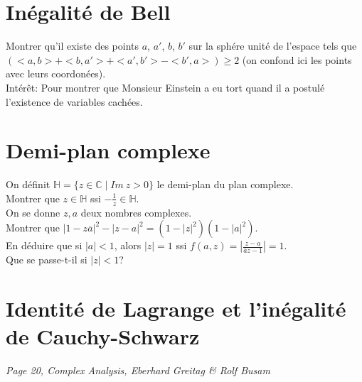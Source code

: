 \documentclass{article}
\begin{document}
\section{In\'egalit\'e de Bell}
Montrer qu'il existe des points $a$, $a'$, $b$, $b'$ sur la sph\'ere unit\'e de l'espace tels que $(<a,b>+<b,a'>+<a',b'>-<b',a>)\geq 2$ (on confond ici les points avec leurs coordon\'ees).\\
Int\'er\^et: Pour montrer que Monsieur Einstein a eu tort quand il a postul\'e l'existence de variables cach\'ees.
\section{Demi-plan complexe}
On d\'efinit $\mathbb{H}=\{z\in\mathbb{C}\mid Im~z>0\}$ le demi-plan du plan complexe.\\
Montrer que $z\in\mathbb{H}$ ssi $-\frac{1}{z}\in\mathbb{H}$.\\
On se donne $z,a$ deux nombres complexes.\\
Montrer que $|1-z\overline{a}|^2-|z-a|^2=(1-|z|^2)(1-|a|^2)$.\\
En d\'eduire que si $|a|<1$, alors $|z|=1$ ssi $f(a,z)=|\frac{z-a}{\overline{a}z-1}|=1$.\\
Que se passe-t-il si $|z|<1$?
\section{Identit\'e de Lagrange et l'in\'egalit\'e de Cauchy-Schwarz}
\emph{Page 20, Complex Analysis, Eberhard Greitag \& Rolf Busam}
\end{document}
